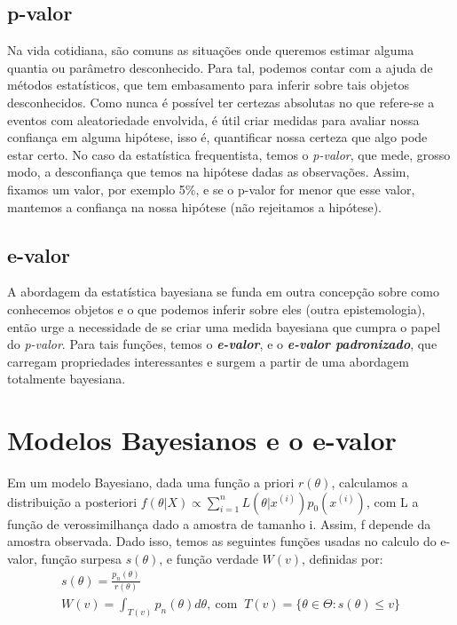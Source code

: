 \documentclass[11pt, a4paper]{article}
\begin{document}
\subsection{p-valor}
Na vida cotidiana, são comuns as situações onde queremos estimar alguma quantia ou parâmetro desconhecido. Para tal, podemos contar com a ajuda de métodos estatísticos, que tem embasamento para inferir sobre tais objetos desconhecidos. Como nunca é possível ter certezas absolutas no que refere-se a eventos com aleatoriedade envolvida, é útil criar medidas para avaliar nossa confiança em alguma hipótese, isso é, quantificar nossa certeza que algo pode estar certo. No caso da estatística frequentista, temos o \textit{p-valor}, que mede, grosso modo, a desconfiança que temos na hipótese dadas as observações. Assim, fixamos um valor, por exemplo 5\%, e se o p-valor for menor que esse valor, mantemos a confiança na nossa hipótese (não rejeitamos a hipótese).
\subsection{e-valor}
A abordagem da estatística bayesiana se funda em outra concepção sobre como conhecemos objetos e o que podemos inferir sobre eles (outra epistemologia), então urge a necessidade de se criar uma medida bayesiana que cumpra o papel do \textit{p-valor}. Para tais funções, temos o \textbf{\textit{e-valor}}, e o \textbf{\textit{e-valor padronizado}}, que carregam propriedades interessantes e surgem a partir de uma abordagem totalmente bayesiana.

\section{Modelos Bayesianos e o e-valor}
Em um modelo Bayesiano, dada uma função a priori $r(\theta)$, calculamos a distribuição a posteriori $f(\theta | X) \propto \sum_{i=1}^{n}L(\theta|x^{(i)})p_0(x^{(i)}) $, com L a função de verossimilhança dado a amostra de tamanho i. Assim, f depende da amostra observada. Dado isso, temos as seguintes funções usadas no calculo do e-valor, função surpesa $s(\theta)$, e função verdade $W(v)$, definidas por: \\

\begin{gather*}
s(\theta) = \frac{p_n(\theta)}{r(\theta)} \\
W(v) = \int_{T(v)} p_n(\theta) d\theta, \  \text{com } \ T(v) = \{ \theta \in \Theta : s(\theta) \leq v \} \\
\end{gather*}
\end{document}
